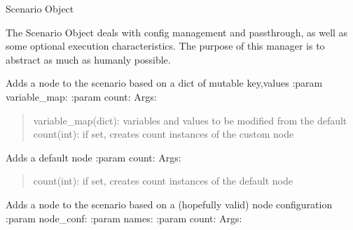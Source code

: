 \documentclass[letterpaper,10pt,english]{sphinxmanual}
\begin{document}
\begin{fulllineitems}
\label{index:polybos.Scenario}
Scenario Object

The Scenario Object deals with config management and passthrough, as well as some optional
execution characteristics. The purpose of this manager is to abstract as much as humanly
possible.

\begin{fulllineitems}
\label{index:polybos.Scenario.add_custom_node}
Adds a node to the scenario based on a dict of mutable key,values
:param variable\_map:
:param count:
Args:
\begin{quote}

variable\_map(dict): variables and values to be modified from the default
count(int): if set, creates count instances of the custom node
\end{quote}

\end{fulllineitems}


\begin{fulllineitems}
\label{index:polybos.Scenario.add_default_node}
Adds a default node
:param count:
Args:
\begin{quote}

count(int): if set, creates count instances of the default node
\end{quote}

\end{fulllineitems}


\begin{fulllineitems}
\label{index:polybos.Scenario.add_node}
Adds a node to the scenario based on a (hopefully valid) node configuration
:param node\_conf:
:param names:
:param count:
Args:
\begin{quote}


\end{quote}
\end{fulllineitems}
\end{fulllineitems}
\end{document}
